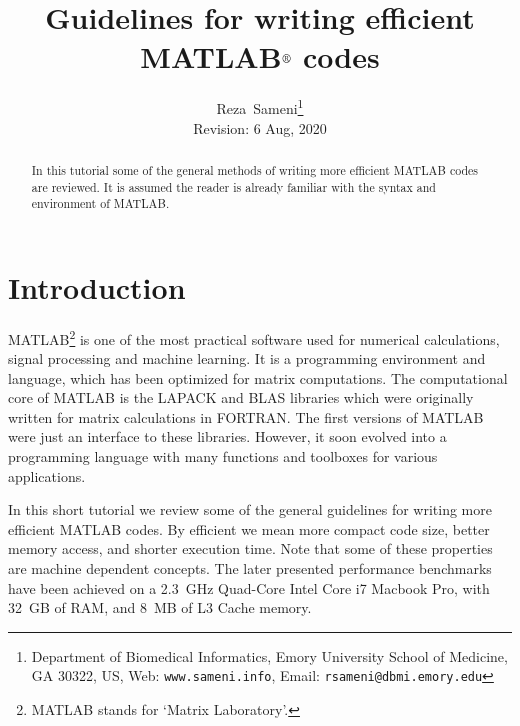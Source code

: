 \documentclass[10pt,a4paper]{article}
\begin{document}
\title{Guidelines for writing efficient MATLAB$^{\text{\small{\textregistered}}}$ codes}
\author{Reza~Sameni\footnote{Department of Biomedical Informatics, Emory University School of Medicine, GA 30322, US, Web: \texttt{www.sameni.info}, Email: \texttt{rsameni@dbmi.emory.edu}}\\
Revision: 6 Aug, 2020}
\date{}
\maketitle
\thispagestyle{empty}
\begin{abstract}
In this tutorial some of the general methods of writing more efficient MATLAB codes are reviewed. It is assumed the reader is already familiar with the syntax and environment of MATLAB.
\end{abstract}
\section{Introduction}
\label{sec:introduction}
MATLAB\footnote{MATLAB stands for `Matrix Laboratory'.} is one of the most practical software used for numerical calculations, signal processing and machine learning. It is a programming environment and language, which has been optimized for matrix computations. The computational core of MATLAB is the LAPACK and BLAS libraries which were originally written for matrix calculations in FORTRAN. The first versions of MATLAB were just an interface to these libraries. However, it soon evolved into a programming language with many functions and toolboxes for various applications.

In this short tutorial we review some of the general guidelines for writing more efficient MATLAB codes. By efficient we mean more compact code size, better memory access, and shorter execution time. Note that some of these properties are machine dependent concepts. The later presented performance benchmarks have been achieved on a 2.3~GHz Quad-Core Intel Core i7 Macbook Pro, with 32~GB of RAM, and 8~MB of L3 Cache memory.
\end{document}
